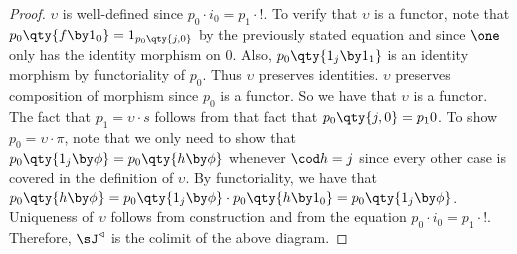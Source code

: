\documentclass[../../main]{subfiles}
\begin{document}
\begin{proof}
	$\upsilon$ is well-defined since $p_{0} \cdot i_{0}  = p_{1} \cdot !  $. To
	verify that $\upsilon$ is a functor, note that $p_{0}\qty{f\by1_{0}} =
	1_{p_{0}\qty{j,0}}$ by the previously stated equation and since $\one$ only
	has the identity morphism on $0$. Also, $p_{0}\qty{1_{j}\by1_{1}}$ is an
	identity morphism by functoriality of $p_{0}$. Thus $\upsilon$ preserves
	identities. $\upsilon$ preserves composition of morphism since $p_{0}$ is a
	functor. So we have that $\upsilon$  is a functor. The fact that $p_{1} =
	\upsilon \cdot  s $ follows from that fact that $p_{0}\qty{j,0}  = p_{1} 0
	$. To show $p_{0} = \upsilon \cdot  \pi $, note that we only need to show
	that $p_{0}\qty{1_{j}\by\phi} = p_{0}\qty{h\by\phi}$ whenever $\cod h = j$
	since every other case is covered in the definition of $\upsilon$. By
	functoriality, we have that $p_{0}\qty{h\by\phi} =
	p_{0}\qty{1_{j}\by\phi}\cdot p_{0}\qty{h\by 1_{0}} =
	p_{0}\qty{1_{j}\by\phi}$. Uniqueness of $\upsilon$ follows from construction
	and from the equation $p_{0} \cdot i_{0}  = p_{1} \cdot !  $. Therefore,
	$\sJ^{\triangleleft}$ is the colimit of the above diagram.
\end{proof}
\end{document}
